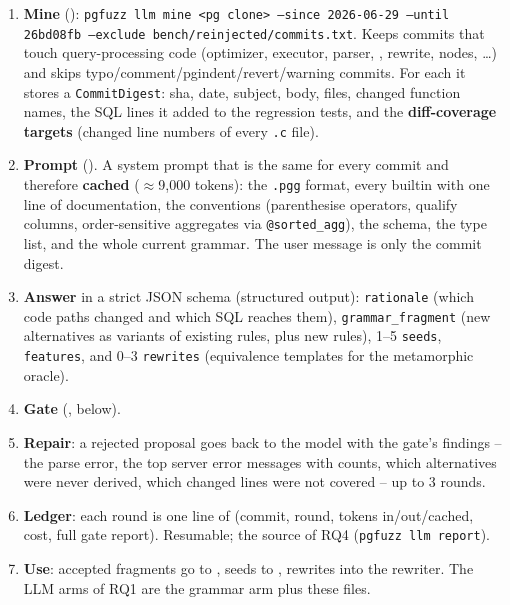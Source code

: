 \begin{enumerate}
  \item \textbf{Mine} ():
    \texttt{pgfuzz llm mine <pg clone> --since 2026-06-29 --until 26bd08fb
    --exclude bench/reinjected/commits.txt}. Keeps commits that touch
    query-processing code (optimizer, executor, parser, ,
    rewrite, nodes, \dots) and skips typo/comment/pgindent/revert/warning
    commits. For each it stores a \texttt{CommitDigest}: sha, date, subject,
    body, files, changed function names, the SQL lines it added to the
    regression tests, and the \textbf{diff-coverage targets} (changed line
    numbers of every \texttt{.c} file).
  \item \textbf{Prompt} (). A system prompt that is the same for
    every commit and therefore \textbf{cached} ($\approx$9{,}000 tokens): the
    \texttt{.pgg} format, every builtin with one line of documentation, the
    conventions (parenthesise operators, qualify columns, order-sensitive
    aggregates via \texttt{@sorted\_agg}), the schema, the type list, and the
    whole current grammar. The user message is only the commit digest.
  \item \textbf{Answer} in a strict JSON schema (structured output):
    \texttt{rationale} (which code paths changed and which SQL reaches them),
    \texttt{grammar\_fragment} (new alternatives as variants of existing rules,
    plus new rules), 1--5 \texttt{seeds}, \texttt{features}, and 0--3
    \texttt{rewrites} (equivalence templates for the metamorphic oracle).
  \item \textbf{Gate} (, below).
  \item \textbf{Repair}: a rejected proposal goes back to the model with the
    gate's findings -- the parse error, the top server error messages with
    counts, which alternatives were never derived, which changed lines were not
    covered -- up to 3 rounds.
  \item \textbf{Ledger}: each round is one line of  (commit,
    round, tokens in/out/cached, cost, full gate report). Resumable; the
    source of RQ4 (\texttt{pgfuzz llm report}).
  \item \textbf{Use}: accepted fragments go to
    , seeds to , rewrites
    into the rewriter. The LLM arms of RQ1 are the grammar arm plus these files.
\end{enumerate}

